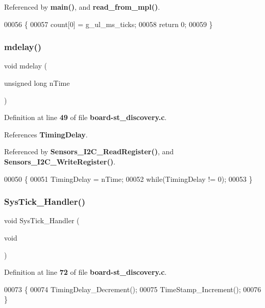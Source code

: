 Referenced by \textbf{ main()}, and \textbf{ read\+\_\+from\+\_\+mpl()}.


\begin{DoxyCode}
00056 \{
00057         count[0] = g_ul_ms_ticks;
00058     \textcolor{keywordflow}{return} 0;
00059 \}
\end{DoxyCode}
\mbox{\label{board-st__discovery_8h_aac3cd1e2cc3631be4fe17ab30f42fcc7}} 
\subsubsection{mdelay()}
{\footnotesize\ttfamily void mdelay (\begin{DoxyParamCaption}\item[{unsigned long}]{n\+Time }\end{DoxyParamCaption})}



Definition at line \textbf{ 49} of file \textbf{ board-\/st\+\_\+discovery.\+c}.



References \textbf{ Timing\+Delay}.



Referenced by \textbf{ Sensors\+\_\+\+I2\+C\+\_\+\+Read\+Register()}, and \textbf{ Sensors\+\_\+\+I2\+C\+\_\+\+Write\+Register()}.


\begin{DoxyCode}
00050 \{
00051     TimingDelay = nTime;
00052     \textcolor{keywordflow}{while}(TimingDelay != 0);
00053 \}
\end{DoxyCode}
\mbox{\label{board-st__discovery_8h_ab5e09814056d617c521549e542639b7e}} 
\subsubsection{Sys\+Tick\+\_\+\+Handler()}
{\footnotesize\ttfamily void Sys\+Tick\+\_\+\+Handler (\begin{DoxyParamCaption}\item[{void}]{ }\end{DoxyParamCaption})}



Definition at line \textbf{ 72} of file \textbf{ board-\/st\+\_\+discovery.\+c}.


\begin{DoxyCode}
00073 \{
00074     TimingDelay_Decrement();
00075     TimeStamp_Increment();
00076 \}
\end{DoxyCode}
